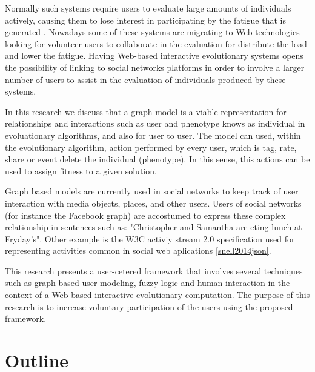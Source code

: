 \par Normally such systems require users to evaluate large amounts of
individuals actively, causing them to lose interest in participating by the
fatigue that is generated \cite{takagi2001interactive}. Nowadays some of these
systems are migrating to Web technologies looking for volunteer users to
collaborate in the evaluation for distribute the load and lower the fatigue.
Having Web-based interactive evolutionary systems opens the possibility of
linking to social networks platforms in order to involve a larger number of
users to assist in the evaluation of individuals produced by these systems.

\par In this research we discuss that a graph model is a viable representation for
relationships and interactions such as user and phenotype knows as individual in
evoluationary algorithms, and also for user to user. The model can used, within
the evolutionary algorithm, action performed by every user, which is tag, rate,
share or event delete the individual (phenotype). In this sense, this actions
can be used to assign fitness to a given solution.

\par Graph based models are currently used in social networks to keep track of
user interaction with media objects, places, and other users. Users of social
networks (for instance the Facebook graph) are accostumed to express these
complex relationship in sentences such as: "Christopher and Samantha are eting
lunch at Fryday's". Other example is the W3C activiy stream 2.0 specification
used for representing activities common in social web aplications
\ref{snell2014json}.

\par This research presents a user-cetered framework that involves several
techniques such as graph-based user modeling, fuzzy logic and human-interaction
in the context of a Web-based interactive evolutionary computation. The purpose
of this research is to increase voluntary participation of the users  using the
proposed framework.

\section{Outline}

